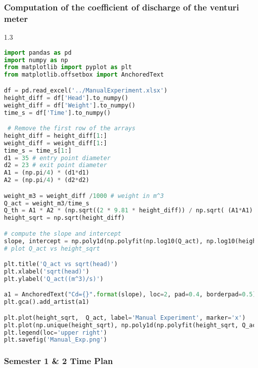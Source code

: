 \subsubsection*{Computation of the coefficient of discharge of the venturi meter}

\begin{spacing}{1.3}
\begin{lstlisting}[language=Python, caption=$c_d$ computations]
import pandas as pd
import numpy as np
from matplotlib import pyplot as plt
from matplotlib.offsetbox import AnchoredText

df = pd.read_excel('../ManualExperiment.xlsx')
height_diff = df['Head'].to_numpy()
weight_diff = df['Weight'].to_numpy()
time_s = df['Time'].to_numpy()

 # Remove the first row of the arrays
height_diff = height_diff[1:]
weight_diff = weight_diff[1:]
time_s = time_s[1:]
d1 = 35 # entry point diameter
d2 = 23 # exit point diameter
A1 = (np.pi/4) * (d1*d1)
A2 = (np.pi/4) * (d2*d2)

weight_m3 = weight_diff /1000 # weight in m^3
Q_act = weight_m3/time_s
Q_th = A1 * A2 * (np.sqrt((2 * 9.81 * height_diff)) / np.sqrt( (A1*A1) * (A2 * A2)))
height_sqrt = np.sqrt(height_diff)

# compute the slope and intercept
slope, intercept = np.poly1d(np.polyfit(np.log10(Q_act), np.log10(height_sqrt), 1))
# plot Q_act vs height_sqrt

plt.title('Q_act vs sqrt(head)')
plt.xlabel('sqrt(head)')
plt.ylabel('Q_act((m^3)/s)')

a1 = AnchoredText("Cd={}".format(slope), loc=2, pad=0.4, borderpad=0.5)
plt.gca().add_artist(a1)

plt.plot(height_sqrt,  Q_act, label='Manual Experiment', marker='x')
plt.plot(np.unique(height_sqrt), np.poly1d(np.polyfit(height_sqrt, Q_act, 1))(np.unique(height_sqrt)), label='Line of best fit')
plt.legend(loc='upper right')
plt.savefig('Manual_Exp.png')
\end{lstlisting}
\end{spacing}


\subsubsection*{Semester 1 \& 2 Time Plan}

